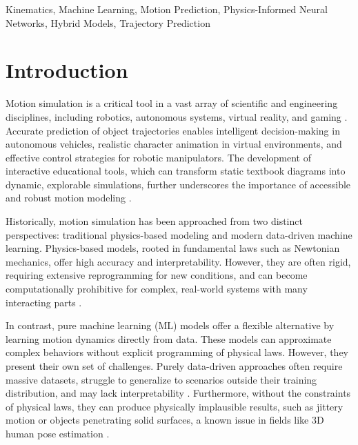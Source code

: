 \documentclass[conference]{IEEEtran}
\begin{document}
\begin{IEEEkeywords}
Kinematics, Machine Learning, Motion Prediction, Physics-Informed Neural Networks, Hybrid Models, Trajectory Prediction
\end{IEEEkeywords}

\section{Introduction}
Motion simulation is a critical tool in a vast array of scientific and engineering disciplines, including robotics, autonomous systems, virtual reality, and gaming \cite{b1}. Accurate prediction of object trajectories enables intelligent decision-making in autonomous vehicles, realistic character animation in virtual environments, and effective control strategies for robotic manipulators. The development of interactive educational tools, which can transform static textbook diagrams into dynamic, explorable simulations, further underscores the importance of accessible and robust motion modeling \cite{b2}.

Historically, motion simulation has been approached from two distinct perspectives: traditional physics-based modeling and modern data-driven machine learning. Physics-based models, rooted in fundamental laws such as Newtonian mechanics, offer high accuracy and interpretability. However, they are often rigid, requiring extensive reprogramming for new conditions, and can become computationally prohibitive for complex, real-world systems with many interacting parts \cite{b3, b4}.

In contrast, pure machine learning (ML) models offer a flexible alternative by learning motion dynamics directly from data. These models can approximate complex behaviors without explicit programming of physical laws. However, they present their own set of challenges. Purely data-driven approaches often require massive datasets, struggle to generalize to scenarios outside their training distribution, and may lack interpretability \cite{b5}. Furthermore, without the constraints of physical laws, they can produce physically implausible results, such as jittery motion or objects penetrating solid surfaces, a known issue in fields like 3D human pose estimation \cite{b6}.
\end{document}
